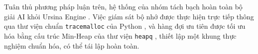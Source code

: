 Tuân thủ phương pháp luận trên, hệ thống của nhóm tách bạch hoàn toàn
bộ giải AI khỏi Ursina Engine \cite{amland2020ursina, panda3d2024manual}.
Việc giám sát bộ nhớ được thực hiện trực tiếp thông qua thư viện chuẩn
\texttt{tracemalloc} của Python \cite{python2024tracemalloc}, và hàng đợi
ưu tiên được tối ưu hóa bằng cấu trúc Min-Heap của thư viện \texttt{heapq}
\cite{python2024heapq}, thiết lập một khung thực nghiệm chuẩn hóa, có thể
tái lập hoàn toàn.
